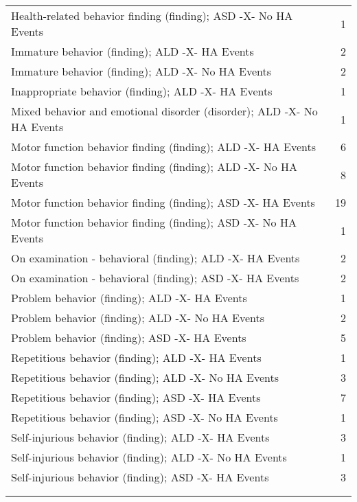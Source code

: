 \documentclass[10pt, letterpaper]{article}
\begin{document}
\begin{spacing}{1.0}
\begin{small}
\begin{longtable}[H]{p{5in}r}
        \rowcolor{ltBlue}
        Health-related behavior finding (finding); ASD -X- No HA Events & 1 \\
        Immature behavior (finding); ALD -X- HA Events & 2 \\
        \rowcolor{ltBlue}
        Immature behavior (finding); ALD -X- No HA Events & 2 \\
        Inappropriate behavior (finding); ALD -X- HA Events & 1 \\
        \rowcolor{ltBlue}
        Mixed behavior and emotional disorder (disorder); ALD -X- No HA Events & 1 \\
        Motor function behavior finding (finding); ALD -X- HA Events & 6 \\
        \rowcolor{ltBlue}
        Motor function behavior finding (finding); ALD -X- No HA Events & 8 \\
        Motor function behavior finding (finding); ASD -X- HA Events & 19 \\
        \rowcolor{ltBlue}
        Motor function behavior finding (finding); ASD -X- No HA Events & 1 \\
        On examination - behavioral (finding); ALD -X- HA Events & 2 \\
        \rowcolor{ltBlue}
        On examination - behavioral (finding); ASD -X- HA Events & 2 \\
        Problem behavior (finding); ALD -X- HA Events & 1 \\
        \rowcolor{ltBlue}
        Problem behavior (finding); ALD -X- No HA Events & 2 \\
        Problem behavior (finding); ASD -X- HA Events & 5 \\
        \rowcolor{ltBlue}
        Repetitious behavior (finding); ALD -X- HA Events & 1 \\
        Repetitious behavior (finding); ALD -X- No HA Events & 3 \\
        \rowcolor{ltBlue}
        Repetitious behavior (finding); ASD -X- HA Events & 7 \\
        Repetitious behavior (finding); ASD -X- No HA Events & 1 \\
        \rowcolor{ltBlue}
        Self-injurious behavior (finding); ALD -X- HA Events & 3 \\
        Self-injurious behavior (finding); ALD -X- No HA Events & 1 \\
        \rowcolor{ltBlue}
        Self-injurious behavior (finding); ASD -X- HA Events & 3 \\
        & \\[-6pt]
        \hline
        \label{tab:Bhv-Dx-HA-01}
    \end{longtable}
\end{small}


\end{spacing}
\end{document}
